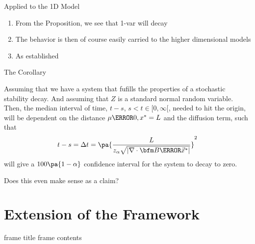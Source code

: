 \documentclass[aspectratio=169,  notheorems, sOuRcEs]{RUCPresentation}
\begin{document}
\begin{frame}{Applied to the 1D Model}

    \begin{enumerate}
        \item From the Proposition, we see that 1-var will decay
        \item The behavior is then of course easily carried to the higher
            dimensional models
        \item As established
    \end{enumerate}

\end{frame}


\begin{frame}{The Corollary}

    \begin{corollary} \label{con:timetodestable}

        Assuming that we have a system that fufills the properties of a stochastic
        stability decay.
        And assuming that \(Z\) is a standard normal random variable.
        Then, the median interval of time, \(t-s\), \(s<t\in[0,\infty[\),
        needed to hit the origin, will be dependent on the distance
        \(\mu\of{0, x^*}= L\) and the diffusion term, such that
        \begin{equation*}
            t-s = \Delta t = \pa{
                {L \over z_\alpha \sqrt{|\nabla \cdot \bfm B\of{\vec{x}^*}|}}
            }^2
        \end{equation*}
        will give a \(100\pa{1-\alpha}\) confidence interval for the
        system to decay to zero.

    \end{corollary}

\end{frame}

\begin{frame}{Does this even make sense as a claim?}


\end{frame}


\section{Extension of the Framework}
\begin{frame}{frame title}
    frame contents
\end{frame}
\end{document}
